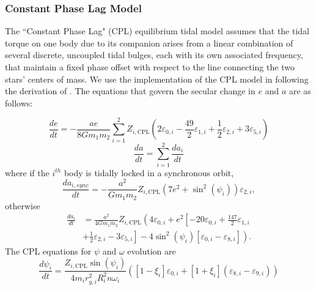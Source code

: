 \subsubsection{Constant Phase Lag Model}

The ``Constant Phase Lag" (CPL) \citep[][]{FerrazMello2008,Heller2011} equilibrium tidal model assumes that the tidal torque on one body due to its companion arises from a linear combination of several discrete, uncoupled tidal bulges, each with its own associated frequency, that maintain a fixed phase offset with respect to the line connecting the two stars' centers of mass. We use the \eqtide implementation of the CPL model in \vplanet following the derivation of \citet{FerrazMello2008}.  The equations that govern the secular change in $e$ and $a$ are as follows:

\begin{equation} \label{sync:eqn:cpl:e}
\frac{de}{dt} = -\frac{ae}{8 G m_1 m_2} \sum_{i=1}^2 Z_{i,\mathrm{CPL}} \left( 2 \varepsilon_{0,i} - \frac{49}{2} \varepsilon_{1,i} + \frac{1}{2} \varepsilon_{2,i} + 3 \varepsilon_{5,i} \right)
\end{equation}
\begin{equation} \label{sync:eqn:cpl:a}
\frac{da}{dt} = \sum_{i=1}^2 \frac{da_i}{dt}
\end{equation}
where if the $i^{th}$ body is tidally locked in a synchronous orbit,
\begin{equation} \label{sync:eqn:cpl:dadt_locked}
\frac{da_{i,sync}}{dt} = -\frac{a^2}{G m_1 m_2} Z_{i,\mathrm{CPL}} \left( 7 e^2 + \sin^2 (\psi_i) \right) \varepsilon_{2,i},
\end{equation}
otherwise
\begin{equation}
\begin{split}
\frac{da_i}{dt} & = \frac{a^2}{4 G m_1 m_2} Z_{i,\mathrm{CPL}} \left( 4 \varepsilon_{0,i} + e^2 \left[ -20 \varepsilon_{0,i} + \frac{147}{2} \varepsilon_{1,i} \right. \right. \\
&  + \left. \left. \frac{1}{2} \varepsilon_{2,i} - 3 \varepsilon_{5,i} \right] - 4 \sin^2 (\psi_i) \left[ \varepsilon_{0,i} - \varepsilon_{8,i} \right] \right).
\end{split}
\end{equation}
The CPL equations for $\psi$ and $\omega$ evolution are
\begin{equation} \label{sync:eqn:cpl:psi}
\frac{d\psi_i}{dt} = \frac{Z_{i,\mathrm{CPL}} \sin(\psi_i)}{4 m_i r_{g,i}^2 R_i^2 n \omega_i} \left( [1-\xi_i] \varepsilon_{0,i} + [1+\xi_i](\varepsilon_{8,i} - \varepsilon_{9,i}) \right)
\end{equation}
